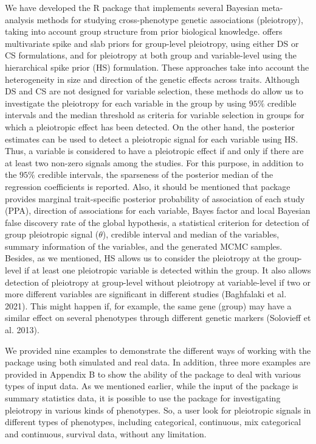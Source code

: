 We have developed the R package  that implements several Bayesian meta-analysis methods for studying cross-phenotype genetic associations (pleiotropy), taking into account group structure from prior biological knowledge.  offers multivariate spike and slab priors for group-level pleiotropy, using either DS or CS formulations, and for pleiotropy at both group and variable-level using the hierarchical spike prior (HS) formulation. These approaches take into account
the heterogeneity in size and direction of the genetic effects across traits. Although DS and CS are not designed for variable selection, these methods do allow us to
investigate the pleiotropy for each variable in the group by using \(95\%\) credible intervals and the median threshold as criteria for variable selection in groups for which a pleiotropic effect has been detected. On the other hand, the posterior estimates can be used to detect a pleiotropic signal for each variable using HS. Thus, a variable is considered to have a pleiotropic effect if and only if there are at least two non-zero signals among the studies. For this purpose, in addition to the \(95\%\) credible intervals, the sparseness of the posterior median of the regression coefficients is reported. Also, it should be mentioned that  package provides marginal trait-specific posterior probability of association of each study (PPA), direction of associations for each variable, Bayes factor and local Bayesian false discovery rate of the global hypothesis, a statistical criterion for detection of group pleiotropic signal (\(\theta\)), credible interval and median of the variables, summary information of the variables, and the generated MCMC samples.
Besides, as we mentioned, HS allows us to consider the pleiotropy at the group-level if at least one pleiotropic variable is detected within the group. It also allows detection of pleiotropy at group-level without pleiotropy at variable-level if two or more different variables are significant in different studies (Baghfalaki et al. 2021).
This might happen if,
for example, the same gene (group) may have a similar effect on several phenotypes through different genetic markers (Solovieff et al. 2013).

We provided nine examples to demonstrate the different ways of working with the package using both simulated and real data. In addition, three more examples are provided in Appendix B to show the ability of the  package to deal with various types of input data. As we mentioned earlier, while the input of the package is summary statistics data, it is possible to use the package for investigating pleiotropy in various kinds of phenotypes. So, a user look for pleiotropic signals in different types of phenotypes, including categorical, continuous, mix categorical and continuous, survival data, without any limitation.

